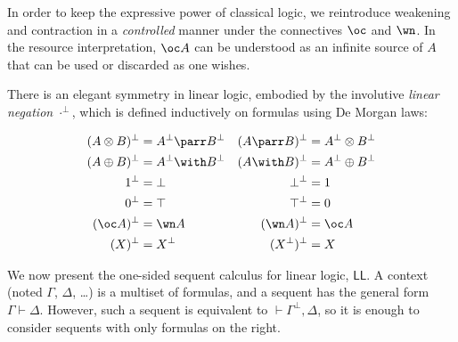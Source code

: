 \documentclass[11pt]{article}
\newcommand\LL{\textsf{LL}}
\newcommand\0{\textbf{0}}
\newcommand\1{\textbf{1}}
\begin{document}
In order to keep the expressive power of classical logic, we reintroduce weakening and contraction in a \emph{controlled}
manner under the connectives $\oc$ and $\wn$. In the resource interpretation, $\oc A$ can be understood as an infinite
source of $A$ that can be used or discarded as one wishes.

There is an elegant symmetry in linear logic, embodied by the involutive \emph{linear negation} $\cdot^\perp$,
which is defined inductively on formulas using De Morgan laws:

\begin{align*}
    (A \otimes B)^\perp &= A^\perp \parr B^\perp & (A \parr B)^\perp &= A^\perp \otimes B^\perp \\
    (A \oplus B)^\perp &= A^\perp \with B^\perp & (A \with B)^\perp &= A^\perp \oplus B^\perp \\
    1^\perp &= \bot & \bot^\perp &= 1 \\
    0^\perp &= \top & \top^\perp &= 0 \\
    (\oc A)^\perp &= \wn A & (\wn A)^\perp &= \oc A \\
    (X)^\perp &= X^\perp & (X^\perp)^\perp &= X
\end{align*}

We now present the one-sided sequent calculus for linear logic, $\LL$. A context (noted $\Gamma$, $\Delta$, \dots)
is a multiset of formulas, and a sequent has the general form $\Gamma \vdash \Delta$. However,
such a sequent is equivalent to $\vdash \Gamma^\perp, \Delta$, so it is enough to consider sequents with only
formulas on the right.
\end{document}
